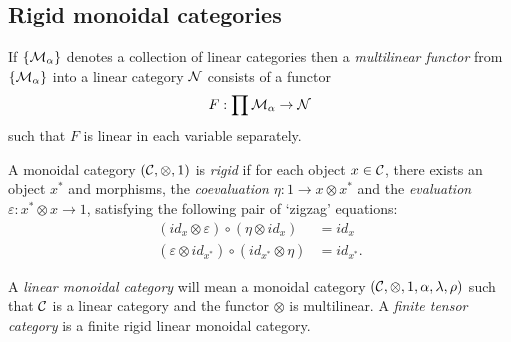 \documentclass{amsart}
\begin{document}
\subsection{Rigid monoidal categories}

	If $\{\mathcal M_\alpha\}$ denotes a collection of linear categories then a {\em multilinear functor} from $\{\mathcal M_\alpha\}$ into a linear category $\mathcal N$ consists of a functor
\begin{equation*}
	F: \prod \mathcal M_\alpha \to \mathcal N
\end{equation*}
such that $F$ is linear in each variable separately. 

\begin{definition} \label{def:rigid}
	A monoidal category $(\mathcal C, \otimes, 1)$ is {\em rigid} if for each object $x \in \mathcal C$, there exists an object $x^*$ and morphisms, the {\em coevaluation} $\eta: 1 \to x \otimes x^*$ and the {\em evaluation} $\varepsilon: x^* \otimes x \to 1$, satisfying the following pair of `zigzag' equations:
	\begin{align*}
		(id_{x} \otimes \varepsilon  ) \circ (  \eta \otimes id_{x}) &= id_{x} \\
		(\varepsilon \otimes id_{x^*}) \circ (id_{x^*} \otimes \eta) &= id_{x^*}.
	\end{align*}
\end{definition}


\begin{definition}
	A {\em linear monoidal category} will mean a monoidal category $(\mathcal C, \otimes, 1, \alpha, \lambda, \rho)$ such that $\mathcal C$ is a linear category and the functor $\otimes$ is multilinear. A {\em finite tensor category} is a finite rigid linear monoidal category.  
\end{definition}

\end{document}
